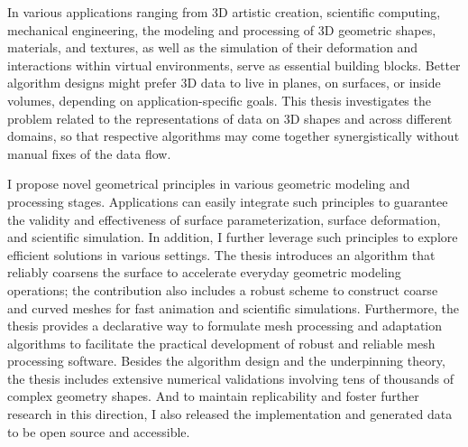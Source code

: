 In various applications ranging from 3D artistic creation, scientific computing, mechanical engineering,
the modeling and processing of 3D geometric shapes, materials, and textures, as well as the simulation of their deformation and interactions within virtual environments, serve as essential building blocks.
Better algorithm designs might prefer 3D data to live in planes, on surfaces, or inside volumes, depending on application-specific goals. 
This thesis investigates the problem related to the representations of data on 3D shapes and across different domains,
so that respective algorithms may come together synergistically without manual fixes of the data flow.

I propose novel geometrical principles in various geometric modeling and processing stages. Applications can easily integrate such principles to guarantee the validity and effectiveness of surface parameterization, surface deformation, and scientific simulation.
In addition, I further leverage such principles to explore efficient solutions in various settings. The thesis introduces an algorithm that reliably coarsens the surface to accelerate everyday geometric modeling operations; the contribution also includes a robust scheme to construct coarse and curved meshes for fast animation and scientific simulations.
Furthermore, the thesis provides a declarative way to formulate mesh processing and adaptation algorithms to facilitate the practical development of robust and reliable mesh processing software.
Besides the algorithm design and the underpinning theory, the thesis includes extensive numerical validations involving tens of thousands of complex geometry shapes. And to maintain replicability and foster further research in this direction, I also released the implementation and generated data to be open source and accessible.

